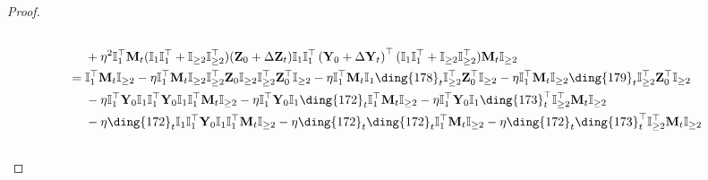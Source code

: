 \documentclass{article}
\theoremstyle{plain}
\theoremstyle{remark}
\def\bY{\mathbf{Y}}
\def\bZ{\mathbf{Z}}
\newcommand{\cc}[1]{\text{\ding{\number\numexpr#1 + 171\relax}}}
\begin{document}
\begin{proof}
\begin{align*}
        \\
        &~~~~
            + \eta^2 \mathbb{I}_{1}^\top\mathbf{M}_{t}(\mathbb{I}_{1}\mathbb{I}_{1}^\top+\mathbb{I}_{\ge 2}\mathbb{I}_{\ge 2}^\top)(\bZ_0+\Delta\bZ_t)\mathbb{I}_{1}\mathbb{I}_{1}^\top\left(\bY_0+\Delta\bY_t\right)^\top (\mathbb{I}_{1}\mathbb{I}_{1}^\top+\mathbb{I}_{\ge 2}\mathbb{I}_{\ge 2}^\top)\mathbf{M}_{t}\mathbb{I}_{\ge 2}
        \\
        &=
            \mathbb{I}_{1}^\top\mathbf{M}_{t}\mathbb{I}_{\ge2}
            - \eta\mathbb{I}_{1}^\top \mathbf{M}_{t} \mathbb{I}_{\ge 2}\mathbb{I}_{\ge 2}^\top \bZ_0 \mathbb{I}_{\ge 2}\mathbb{I}_{\ge2}^\top \bZ_0^\top\mathbb{I}_{\ge2} 
            - \eta\mathbb{I}_{1}^\top \mathbf{M}_{t} \mathbb{I}_{1}\cc{7}_t\mathbb{I}_{\ge2}^\top \bZ_0^\top\mathbb{I}_{\ge2} 
            - \eta\mathbb{I}_{1}^\top \mathbf{M}_{t} \mathbb{I}_{\ge2}\cc{8}_t\mathbb{I}_{\ge2}^\top \bZ_0^\top\mathbb{I}_{\ge2} 
        \\
        &~~~~
            - \eta \mathbb{I}_1^\top \bY_0 \mathbb{I}_1\mathbb{I}_1^\top \bY_0\mathbb{I}_{1}\mathbb{I}_{1}^\top\mathbf{M}_{t} \mathbb{I}_{\ge 2}  
            - \eta \mathbb{I}_1^\top \bY_0 \mathbb{I}_1\cc{1}_t\mathbb{I}_{1}^\top\mathbf{M}_{t} \mathbb{I}_{\ge 2}
            - \eta \mathbb{I}_1^\top \bY_0 \mathbb{I}_1\cc{2}_t^\top\mathbb{I}_{\ge2}^\top\mathbf{M}_{t} \mathbb{I}_{\ge 2}
        \\
        &~~~~ 
            - \eta \cc{1}_t \mathbb{I}_1\mathbb{I}_1^\top \bY_0\mathbb{I}_{1}\mathbb{I}_{1}^\top\mathbf{M}_{t} \mathbb{I}_{\ge 2}  
            - \eta \cc{1}_t\cc{1}_t\mathbb{I}_{1}^\top\mathbf{M}_{t}\mathbb{I}_{\ge 2}
            - \eta \cc{1}_t\cc{2}_t^\top\mathbb{I}_{\ge2}^\top\mathbf{M}_{t} \mathbb{I}_{\ge 2}
        \\
        &~~~~ 

\end{align*}
\end{proof}
\end{document}
